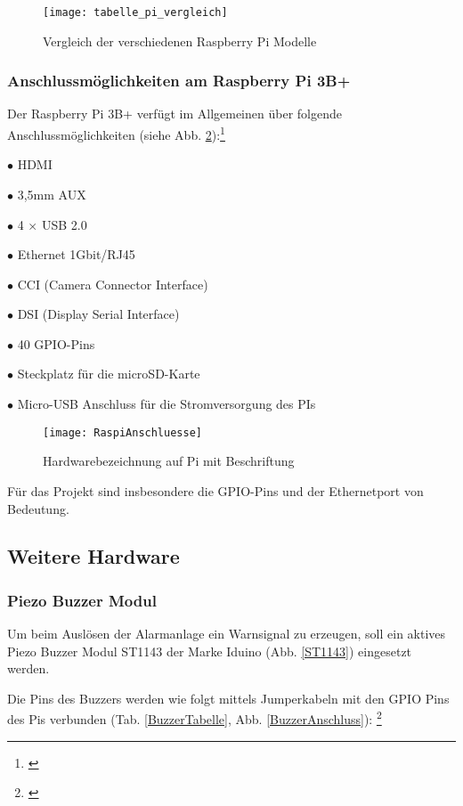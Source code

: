 	\begin{figure}[H]
	\centering
	\texttt{[image: tabelle\_pi\_vergleich]}
	\caption{Vergleich der verschiedenen Raspberry Pi Modelle \protect\cite[S. 59]{Huwe.2019}}
	\label{tabelle_pi_vergleich}
\end{figure}

\subsubsection{Anschlussmöglichkeiten am Raspberry Pi 3B+}
Der Raspberry Pi 3B+ verfügt im Allgemeinen über folgende Anschlussmöglichkeiten (siehe Abb. \ref{RaspiAnschluesse}):\footnote{\cite[S. 60]{Huwe.2019}}\par 
$\bullet$ HDMI   \par %
$\bullet$ 3,5mm AUX\par 
$\bullet$ 4 $\times$ USB 2.0 \par 
$\bullet$ Ethernet 1Gbit/RJ45\par 
$\bullet$ CCI (Camera Connector Interface)\par 
$\bullet$ DSI (Display Serial Interface)\par
$\bullet$ 40 GPIO-Pins\par
$\bullet$ Steckplatz für die microSD-Karte\par
$\bullet$ Micro-USB Anschluss für die Stromversorgung des PIs\par

	\begin{figure}[H]
		\centering
		\texttt{[image: RaspiAnschluesse]}
		\caption{Hardwarebezeichnung auf Pi mit Beschriftung \cite{notebooksbilliger.deAG.21.04.2022}}
		\label{RaspiAnschluesse}
	\end{figure}
	
Für das Projekt sind insbesondere die GPIO-Pins und der Ethernetport von Bedeutung.\par

\newpage

\subsection{Weitere Hardware}
\subsubsection{Piezo Buzzer Modul}
	Um beim Auslösen der Alarmanlage ein Warnsignal zu erzeugen, soll ein aktives Piezo Buzzer Modul ST1143 der Marke Iduino (Abb. \ref{ST1143}) eingesetzt werden.\par Die Pins des Buzzers werden wie folgt mittels Jumperkabeln mit den GPIO Pins des Pis verbunden (Tab. \ref{BuzzerTabelle}, Abb. \ref{BuzzerAnschluss}): \footnote{\cite{Draeger.2019}}
	
